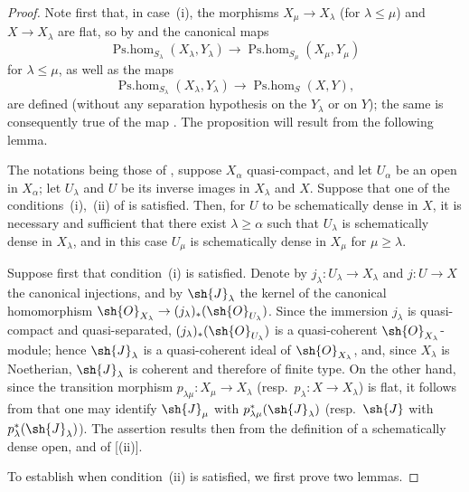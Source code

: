 \begin{proof}
Note first that, in case~(i), the morphisms $X_\mu\to X_\lambda$ (for $\lambda\leq\mu$) and $X\to X_\lambda$ are flat, so by  and  the canonical maps
\[
  \operatorname{Ps.hom}_{S_\lambda}(X_\lambda,Y_\lambda)\to\operatorname{Ps.hom}_{S_\mu}(X_\mu,Y_\mu)
\]
for $\lambda\leq\mu$, as well as the maps
\[
  \operatorname{Ps.hom}_{S_\lambda}(X_\lambda,Y_\lambda)\to\operatorname{Ps.hom}_S(X,Y),
\]
are defined (without any separation hypothesis on the $Y_\lambda$ or on $Y$);
the same is consequently true of the map .
The proposition will result from the following lemma.

\begin{lemma}[20.3.8.2]
\label{IV.20.3.8.2}
The notations being those of , suppose $X_\alpha$ quasi-compact, and let $U_\alpha$ be an open in $X_\alpha$;
let $U_\lambda$ and $U$ be its inverse images in $X_\lambda$ and $X$.
Suppose that one of the conditions~(i),~(ii) of  is satisfied.
Then, for $U$ to be schematically dense in $X$, it is necessary and sufficient that there exist $\lambda\geq\alpha$ such that $U_\lambda$ is schematically dense in $X_\lambda$, and in this case $U_\mu$ is schematically dense in $X_\mu$ for $\mu\geq\lambda$.
\end{lemma}

Suppose first that condition~(i) is satisfied.
Denote by $j_\lambda:U_\lambda\to X_\lambda$ and $j:U\to X$ the canonical injections, and by $\sh{J}_\lambda$ the kernel of the canonical homomorphism $\sh{O}_{X_\lambda}\to(j_\lambda)_*(\sh{O}_{U_\lambda})$.
Since the immersion $j_\lambda$ is quasi-compact and quasi-separated, $(j_\lambda)_*(\sh{O}_{U_\lambda})$ is a quasi-coherent $\sh{O}_{X_\lambda}$-module; hence $\sh{J}_\lambda$ is a quasi-coherent ideal of $\sh{O}_{X_\lambda}$, and, since $X_\lambda$ is Noetherian, $\sh{J}_\lambda$ is coherent and therefore of finite type.
On the other hand, since the transition morphism $p_{\lambda\mu}:X_\mu\to X_\lambda$ (resp.\ $p_\lambda:X\to X_\lambda$) is flat, it follows from  that one may identify $\sh{J}_\mu$ with $p_{\lambda\mu}^*(\sh{J}_\lambda)$ (resp.\ $\sh{J}$ with $p_\lambda^*(\sh{J}_\lambda)$).
The assertion results then from the definition of a schematically dense open, and of [(ii)].

To establish  when condition~(ii) is satisfied, we first prove two lemmas.


\end{proof}
